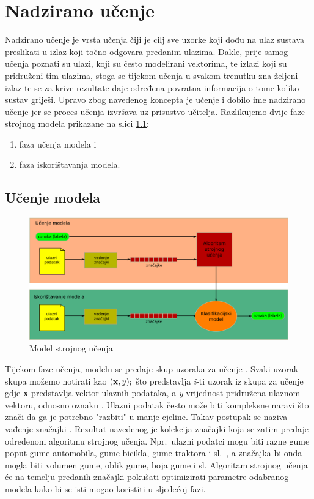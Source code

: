 \documentclass[times, utf8, zavrsni]{fer}
\begin{document}
\chapter{Nadzirano učenje}
Nadzirano učenje  je vrsta učenja čiji je cilj sve uzorke koji dođu na ulaz sustava preslikati u izlaz koji točno odgovara predanim ulazima. Dakle, prije samog učenja poznati su ulazi, koji su često modelirani vektorima, te izlazi koji su pridruženi tim ulazima, stoga se tijekom učenja u svakom trenutku zna željeni izlaz te se za krive rezultate daje određena povratna informacija  o tome koliko sustav griješi. Upravo zbog navedenog koncepta je učenje i dobilo ime nadzirano učenje jer se proces učenja izvršava uz prisustvo učitelja. Razlikujemo dvije faze strojnog modela prikazane na slici \ref{fig:supervised-learning-flow}:
\begin{enumerate}
    \item faza učenja modela i
    \item faza iskorištavanja modela.
\end{enumerate}

\section{Učenje modela}

\begin{figure}[H]
    \centering
    \includegraphics[scale=0.5]{img/supervised-learning-flow.png}
    \caption[Caption for LOF]{Model strojnog učenja\footnotemark}
    \label{fig:supervised-learning-flow}
\end{figure}

Tijekom faze učenja, modelu se predaje skup uzoraka za učenje . Svaki uzorak skupa možemo notirati kao $(\textbf{x}, y)\textsubscript{i}$ što predstavlja \textit{i}-ti uzorak iz skupa za učenje gdje \textbf{x} predstavlja vektor ulaznih podataka, a \textit{y} vrijednost pridružena ulaznom vektoru, odnosno oznaku . Ulazni podatak često može biti kompleksne naravi što znači da ga je potrebno "razbiti" u manje cjeline. Takav postupak se naziva vađenje značajki . Rezultat navedenog je kolekcija značajki koja se zatim predaje određenom algoritmu strojnog učenja. Npr.\ ulazni podatci mogu biti razne gume poput gume automobila, gume bicikla, gume traktora i sl.\ , a značajka bi onda mogla biti volumen gume, oblik gume, boja gume i sl. Algoritam strojnog učenja će na temelju predanih značajki pokušati optimizirati parametre odabranog modela kako bi se isti mogao koristiti u sljedećoj fazi.
\end{document}
